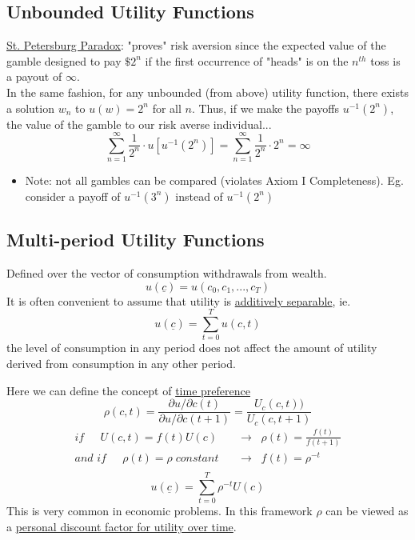 \documentclass[
14pt,notheorems,hyperref={pdfauthor=whatever}
]{beamer}
\begin{document}
\subsection{Unbounded Utility Functions}
\begin{frame}
\underline{St. Petersburg Paradox}: "proves" risk aversion since the expected value of the gamble designed to pay $\$2^n$ if the first occurrence of "heads" is on the $n^{th}$ toss is a payout of $\infty$.\\
\hfill \break
In the same fashion, for any unbounded (from above) utility function, there exists a solution $w_n$ to $u(w)=2^n$ for all $n$. Thus, if we make the payoffs $u^{-1}(2^n)$, the value of the gamble to our risk averse individual...
\[\sum_{n=1}^\infty \frac{1}{2^n} \cdot u[u^{-1}(2^n)] = \sum_{n=1}^\infty \frac{1}{2^n} \cdot 2^n = \infty\]
\begin{itemize}
    \item Note: not all gambles can be compared (violates Axiom I Completeness). Eg. consider a payoff of $u^{-1}(3^n)$ instead of $u^{-1}(2^n)$\\
\end{itemize}
\end{frame}

\subsection{Multi-period Utility Functions}
\begin{frame}
Defined over the vector of consumption withdrawals from wealth.\\
\[u(\underline{c}) = u(c_0, c_1, ..., c_T)\]
It is often convenient to assume that utility is \underline{additively separable}, ie.\\
\[u(\underline{c}) = \sum_{t=0}^T u(c,t)\]
the level of consumption in any period does not affect the amount of utility derived from consumption in any other period.\\
\end{frame}

\begin{frame}
Here we can define the concept of \underline{time preference}\\
\[\rho(c,t) = \frac{\partial u/ \partial c(t)}{\partial u/ \partial c(t+1)} = \frac{U_c(c,t))}{U_c(c,t+1)}\]
\begin{align*}
    \textit{if }\;\;\;\; U(c,t) = f(t) U(c) \;\;&\rightarrow\;\; \rho(t) = \frac{f(t)}{f(t+1)}\\
    \textit{and if }\;\;\;\; \rho(t) = \rho\;\textit{constant } \;\;&\rightarrow\;\; f(t)=\rho^{-t}\\
\end{align*}
\[u(\underline{c}) = \sum_{t=0}^T \rho^{-t}U(c)\]
This is very common in economic problems. In this framework $\rho$ can be viewed as a \underline{personal discount factor for utility over time}. 
\end{frame}
\end{document}
